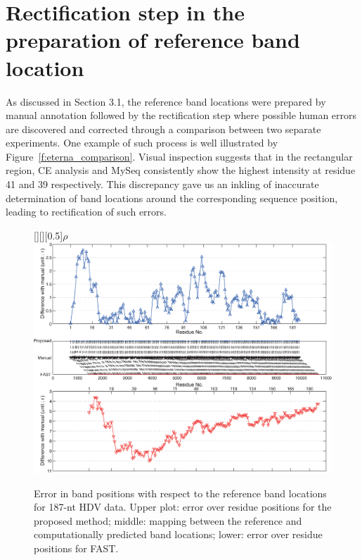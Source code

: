 \documentclass[letter]{bioinfo}
\begin{document}
\section{ Rectification step in the preparation of reference band location }
As discussed in Section 3.1, the reference band locations were prepared by manual annotation followed by the rectification step where possible human errors are discovered and corrected through a comparison between two separate experiments. One example of such process is well illustrated by Figure~\ref{f:eterna_comparison}. Visual inspection suggests that in the rectangular region, CE analysis and MySeq consistently show the highest intensity at residue 41 and 39 respectively. This discrepancy gave us an inkling of inaccurate determination of band locations around the corresponding sequence position, leading to rectification of such errors.


\begin{figure}
\centering
	[][][0.5]{$\rho$}
\includegraphics[width=\linewidth]{figures/result_hdv_result_detail2}
\caption{Error in band positions with respect to the reference band locations for 187-nt HDV data. Upper plot: error over residue positions for the proposed method; middle: mapping between the reference and computationally predicted band locations; lower: error over residue positions for FAST.}
\label{f:hdv-result-detail}
\end{figure}
\end{document}
